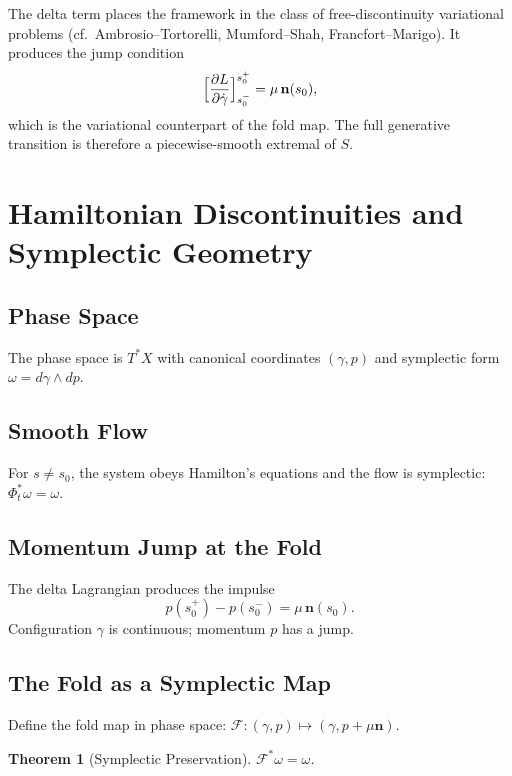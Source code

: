 \documentclass[12pt,a4paper]{article}
\newtheorem{theorem}{Theorem}[section]
\begin{document}
The delta term places the framework in the class of free-discontinuity
variational problems (cf.\ Ambrosio--Tortorelli, Mumford--Shah,
Francfort--Marigo).
It produces the jump condition
\[
  \Bigl[\frac{\partial L}{\partial\dot\gamma}\Bigr]_{s_0^-}^{s_0^+}
  = \mu\,\mathbf{n}(s_0),
\]
which is the variational counterpart of the fold map.
The full generative transition is therefore a piecewise-smooth
extremal of $S$.

\section{Hamiltonian Discontinuities and Symplectic Geometry}
\label{sec:hamiltonian}

\subsection{Phase Space}

The phase space is $T^*X$ with canonical coordinates $(\gamma, p)$
and symplectic form $\omega = d\gamma \wedge dp$.

\subsection{Smooth Flow}

For $s \neq s_0$, the system obeys Hamilton's equations and the flow
is symplectic: $\Phi_t^*\omega = \omega$.

\subsection{Momentum Jump at the Fold}

The delta Lagrangian produces the impulse
\[
  p(s_0^+) - p(s_0^-) = \mu\,\mathbf{n}(s_0).
\]
Configuration $\gamma$ is continuous; momentum $p$ has a jump.

\subsection{The Fold as a Symplectic Map}

Define the fold map in phase space:
$\mathcal{F} : (\gamma, p) \mapsto (\gamma, p + \mu\mathbf{n})$.

\begin{theorem}[Symplectic Preservation]
\label{thm:symplectic}
$\mathcal{F}^*\omega = \omega$.
\end{theorem}
\end{document}
